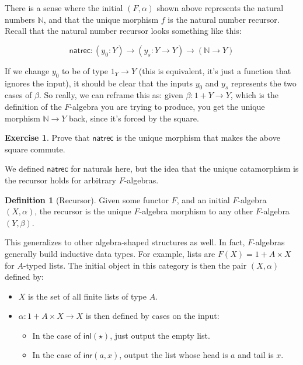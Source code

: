 \documentclass{article}
\theoremstyle{plain}
\theoremstyle{definition}
\newtheorem{definition}{Definition}
\newtheorem{exercise}{Exercise}
\begin{document}
There is a sense where the initial \ensuremath{\left( F, \alpha \right)} shown above represents the natural numbers \ensuremath{\mathbb{N}}, and that the unique morphism \ensuremath{f} is the natural number recursor. Recall that the natural number recursor looks something like this:

\[
\mathsf{natrec} : \left( {y}_{0} : Y \right) \rightarrow \left( {y}_{s} : Y \rightarrow Y \right) \rightarrow \left( \mathbb{N} \rightarrow Y \right)
\]

 If we change \ensuremath{{y}_{0}} to be of type \ensuremath{{1}_{Y} \rightarrow Y} (this is equivalent, it's just a function that ignores the input), it should be clear that the inputs \ensuremath{{y}_{0}} and \ensuremath{{y}_{s}} represents the two cases of \ensuremath{\beta}. So really, we can reframe this as: given \ensuremath{\beta : 1 + Y \rightarrow Y}, which is the definition of the \ensuremath{F}-algebra you are trying to produce, you get the unique morphism \ensuremath{\mathbb{N} \rightarrow Y} back, since it's forced by the square.

 

\begin{exercise}
Prove that \ensuremath{\mathsf{natrec}} is the unique morphism that makes the above square commute.
\end{exercise}


We defined \ensuremath{\mathsf{natrec}} for naturals here, but the idea that the unique catamorphism is the recursor holds for arbitrary \ensuremath{F}-algebras.

\begin{definition}[Recursor]
 Given some functor \ensuremath{F}, and an initial \ensuremath{F}-algebra \ensuremath{\left( X, \alpha \right)}, the recursor is the unique \ensuremath{F}-algebra morphism to any other \ensuremath{F}-algebra \ensuremath{\left( Y, \beta \right)}. 
\end{definition}


This generalizes to other algebra-shaped structures as well. In fact, \ensuremath{F}-algebras generally build inductive data types. For example, lists are \ensuremath{F\left( X \right) = 1 + A \times X} for \ensuremath{A}-typed lists. The initial object in this category is then the pair \ensuremath{\left( X, \alpha \right)} defined by:

\begin{itemize}
\item \ensuremath{X} is the set of all finite lists of type \ensuremath{A}.
\item \ensuremath{\alpha : 1 + A \times X \rightarrow X} is then defined by cases on the input: \begin{itemize}
\item In the case of \ensuremath{\mathsf{inl}\left( \star \right)}, just output the empty list.
\item In the case of \ensuremath{\mathsf{inr}\left( a, x \right)}, output the list whose head is \ensuremath{a} and tail is \ensuremath{x}.
\end{itemize}

\end{itemize}
\end{document}
